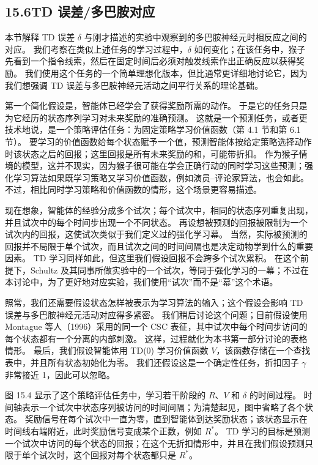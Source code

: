 \documentclass[UTF8,12pt,a4paper,fontset=fandol]{ctexart}
\begin{document}
\subsection*{15.6\quad TD 误差/多巴胺对应}

本节解释 TD 误差 $\delta$ 与刚才描述的实验中观察到的多巴胺神经元时相反应之间的对应。
我们考察在类似上述任务的学习过程中，$\delta$ 如何变化；在该任务中，猴子先看到一个指令线索，然后在固定时间后必须对触发线索作出正确反应以获得奖励。
我们使用这个任务的一个简单理想化版本，但比通常更详细地讨论它，因为我们想强调 TD 误差与多巴胺神经元活动之间平行关系的理论基础。

第一个简化假设是，智能体已经学会了获得奖励所需的动作。
于是它的任务只是为它经历的状态序列学习对未来奖励的准确预测。
这就是一个预测任务，或者更技术地说，是一个策略评估任务：为固定策略学习价值函数（第 4.1 节和第 6.1 节）。
要学习的价值函数给每个状态赋予一个值，预测智能体按给定策略选择动作时该状态之后的回报；这里回报是所有未来奖励的和，可能带折扣。
作为猴子情境的模型，这并不现实，因为猴子很可能在学会正确行动的同时学习这些预测；强化学习算法如果既学习策略又学习价值函数，例如演员--评论家算法，也会如此。
不过，相比同时学习策略和价值函数的情形，这个场景更容易描述。

现在想象，智能体的经验分成多个试次；每个试次中，相同的状态序列重复出现，并且试次中的每个时间步出现一个不同状态。
再设想被预测的回报被限制为一个试次内的回报，这使试次类似于我们定义过的强化学习幕。
当然，实际被预测的回报并不局限于单个试次，而且试次之间的时间间隔也是决定动物学到什么的重要因素。
TD 学习同样如此，但这里我们假设回报不会跨多个试次累积。
在这个前提下，Schultz 及其同事所做实验中的一个试次，等同于强化学习的一幕；不过在本讨论中，为了更好地对应实验，我们使用“试次”而不是“幕”这个术语。

照常，我们还需要假设状态怎样被表示为学习算法的输入；这个假设会影响 TD 误差与多巴胺神经元活动对应得多紧密。
我们稍后讨论这个问题；目前假设使用 Montague 等人（1996）采用的同一个 CSC 表征，其中试次中每个时间步访问的每个状态都有一个分离的内部刺激。
这样，过程就化为本书第一部分讨论的表格情形。
最后，我们假设智能体用 TD(0) 学习价值函数 $V$，该函数存储在一个查找表中，并且所有状态初始化为零。
我们还假设这是一个确定性任务，折扣因子 $\gamma$ 非常接近 1，因此可以忽略。

图 15.4 显示了这个策略评估任务中，学习若干阶段的 $R$、$V$ 和 $\delta$ 的时间过程。
时间轴表示一个试次中状态序列被访问的时间间隔；为清楚起见，图中省略了各个状态。
奖励信号在每个试次中一直为零，直到智能体到达奖励状态；该状态显示在时间线右端附近，此时奖励信号变成某个正数，例如 $R^*$。
TD 学习的目标是预测一个试次中访问的每个状态的回报；在这个无折扣情形中，并且在我们假设预测只限于单个试次时，这个回报对每个状态都只是 $R^*$。
\end{document}
